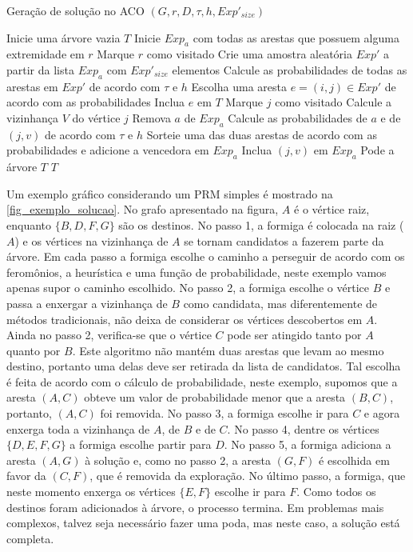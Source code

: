 \begin{algorithm}
	\caption{Geração de solução no ACO $(G, r, D, \tau, h, Exp'_{size})$}
	\label{alg_aco_prm_construir_solucao}
	\begin{algorithmic}[1]
		\State Inicie uma árvore vazia $T$
		\State Inicie $Exp_a$ com todas as arestas que possuem alguma extremidade em $r$
		\State Marque $r$ como visitado
		\State Crie uma amostra aleatória $Exp'$ a partir da lista $Exp_a$ com $Exp'_{size}$ elementos
		\State Calcule as probabilidades de todas as arestas em $Exp'$ de acordo com $\tau$ e $h$
		\State Escolha uma aresta $e=(i,j) \in Exp'$ de acordo com as probabilidades
		\State Inclua $e$ em $T$
		\State Marque $j$ como visitado
		\State Calcule a vizinhança $V$ do vértice $j$
		\State Remova $a$ de $Exp_a$
		\State Calcule as probabilidades de $a$ e de $(j, v)$ de acordo com $\tau$ e $h$
		\State Sorteie uma das duas arestas de acordo com as probabilidades e adicione a vencedora em $Exp_a$
		\State Inclua $(j, v)$ em $Exp_a$
		\EndIf
		\EndFor
		\EndWhile
		\State Pode a árvore $T$
		\State \Return $T$
	\end{algorithmic}
\end{algorithm}

Um exemplo gráfico considerando um PRM simples é mostrado na \autoref{fig_exemplo_solucao}. No grafo apresentado na figura, $A$ é o vértice raiz, enquanto $\{B, D, F, G\}$ são os destinos. No passo 1, a formiga é colocada na raiz ($A$) e os vértices na vizinhança de $A$ se tornam candidatos a fazerem parte da árvore. Em cada passo a formiga escolhe o caminho a perseguir de acordo com os feromônios, a heurística e uma função de probabilidade, neste exemplo vamos apenas supor o caminho escolhido. No passo 2, a formiga escolhe o vértice $B$ e passa a enxergar a vizinhança de $B$ como candidata, mas diferentemente de métodos tradicionais, não deixa de considerar os vértices descobertos em $A$. Ainda no passo 2, verifica-se que o vértice $C$ pode ser atingido tanto por $A$ quanto por $B$. Este algoritmo não mantém duas arestas que levam ao mesmo destino, portanto uma delas deve ser retirada da lista de candidatos. Tal escolha é feita de acordo com o cálculo de probabilidade, neste exemplo, supomos que a aresta $(A, C)$ obteve um valor de probabilidade menor que a aresta $(B, C)$, portanto, $(A, C)$ foi removida. No passo 3, a formiga escolhe ir para $C$ e agora enxerga toda a vizinhança de $A$, de $B$ e de $C$. No passo 4, dentre os vértices $\{D, E, F, G\}$ a formiga escolhe partir para $D$. No passo 5, a formiga adiciona a aresta $(A, G)$ à solução e, como no passo 2, a aresta $(G, F)$ é escolhida em favor da $(C, F)$, que é removida da exploração. No último passo, a formiga, que neste momento enxerga os vértices $\{E, F\}$ escolhe ir para $F$. Como todos os destinos foram adicionados à árvore, o processo termina. Em problemas mais complexos, talvez seja necessário fazer uma poda, mas neste caso, a solução está completa.


